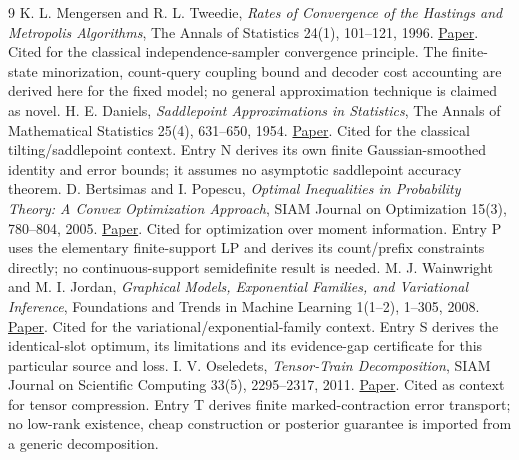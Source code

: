 \documentclass[10pt,a4paper]{article}
\begin{document}
\clearpage
\begin{thebibliography}{9}
 K. L. Mengersen and R. L. Tweedie,
\emph{Rates of Convergence of the Hastings and Metropolis Algorithms},
The Annals of Statistics 24(1), 101--121, 1996.
\href{https://www2.stat.duke.edu/~scs/Courses/Stat376/Papers/ConvergeRates/GeneralState/MengersenTweedieAnnStat1996.pdf}
{Paper}. Cited for the classical independence-sampler convergence principle. The finite-state minorization,
count-query coupling bound and decoder cost accounting are derived here for the fixed model; no general
approximation technique is claimed as novel.
 H. E. Daniels,
\emph{Saddlepoint Approximations in Statistics},
The Annals of Mathematical Statistics 25(4), 631--650, 1954.
\href{https://people.eecs.berkeley.edu/~jordan/sail/readings/archive/daniels-1954.pdf}{Paper}.
Cited for the classical tilting/saddlepoint context. Entry N derives its own finite Gaussian-smoothed
identity and error bounds; it assumes no asymptotic saddlepoint accuracy theorem.
 D. Bertsimas and I. Popescu,
\emph{Optimal Inequalities in Probability Theory: A Convex Optimization Approach},
SIAM Journal on Optimization 15(3), 780--804, 2005.
\href{https://www.mit.edu/~dbertsim/papers/MomentProblems/Optimal-inequalities-in-probability-theory-A-convex-optimization-approach-SIAM15.pdf}{Paper}.
Cited for optimization over moment information. Entry P uses the elementary finite-support LP and
derives its count/prefix constraints directly; no continuous-support semidefinite result is needed.
 M. J. Wainwright and M. I. Jordan,
\emph{Graphical Models, Exponential Families, and Variational Inference},
Foundations and Trends in Machine Learning 1(1--2), 1--305, 2008.
\href{https://www.cs.princeton.edu/courses/archive/fall11/cos597C/reading/WainwrightJordan2008.pdf}{Paper}.
Cited for the variational/exponential-family context. Entry S derives the identical-slot optimum,
its limitations and its evidence-gap certificate for this particular source and loss.
 I. V. Oseledets,
\emph{Tensor-Train Decomposition}, SIAM Journal on Scientific Computing 33(5), 2295--2317, 2011.
\href{https://epubs.siam.org/doi/10.1137/090752286}{Paper}.
Cited as context for tensor compression. Entry T derives finite marked-contraction error transport;
no low-rank existence, cheap construction or posterior guarantee is imported from a generic decomposition.
\end{thebibliography}
\end{document}
